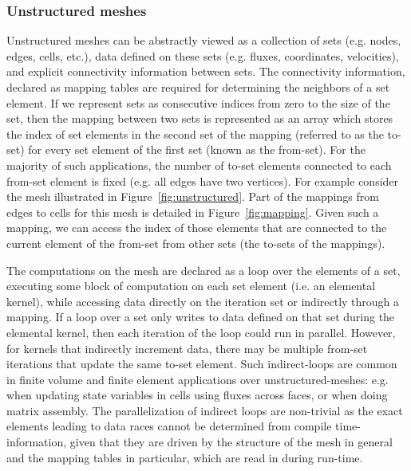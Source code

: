 \subsubsection{Unstructured meshes}\label{unstructured-meshes}

\noindent Unstructured meshes can be abstractly viewed as a collection of sets 
(e.g. nodes, edges, cells, etc.), data defined on these sets (e.g. fluxes, 
coordinates, velocities), and explicit connectivity information between 
sets. The connectivity information, declared as mapping tables are required for 
determining the neighbors of a set element. If we represent sets as consecutive 
indices from zero to the size of the set, then the mapping between two 
sets is represented as an array which stores the index of set elements in the 
second set of the mapping (referred to as the to-set) for every set element of 
the first set (known as the from-set). For the majority of such applications, 
the number of to-set elements connected to each from-set element is fixed (e.g. 
all edges have two vertices). For example consider the mesh illustrated 
in Figure~\ref{fig:unstructured}. Part of the mappings from edges to cells for 
this mesh is detailed in Figure~\ref{fig:mapping}. Given such a mapping, we can 
access the index of those elements that are connected to the current element of 
the from-set from other sets (the to-sets of the mappings). 

The computations on the mesh are declared as a loop over the elements of a set, 
executing some block of computation on each set element (i.e. an elemental kernel), 
while accessing data directly on the iteration set or indirectly through a 
mapping.  If a loop over a set only writes to data defined on that set during the 
elemental kernel, then each iteration of the loop could run in parallel. 
However, for kernels that indirectly increment data, there may be multiple 
from-set iterations that update the same to-set element. Such indirect-loops are 
common in finite volume and finite element applications over 
unstructured-meshes: e.g. when updating state variables in cells using fluxes 
across faces, or when doing matrix assembly. The parallelization of indirect 
loops are non-trivial as the exact elements leading to data races cannot be 
determined from compile time-information, given that they are driven by the 
structure of the mesh in general and the mapping tables in particular, which are 
read in during run-time. 



